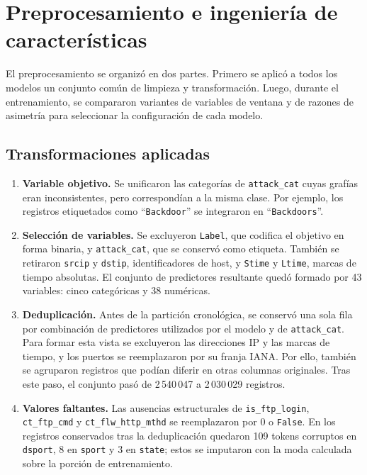 \documentclass[conference]{IEEEtran}
\begin{document}
\section{Preprocesamiento e ingeniería de características}

El preprocesamiento se organizó en dos partes. Primero se aplicó a todos los modelos un conjunto común de limpieza y transformación. Luego, durante el entrenamiento, se compararon variantes de variables de ventana y de razones de asimetría para seleccionar la configuración de cada modelo.

\subsection{Transformaciones aplicadas}

\begin{enumerate}

\item \textbf{Variable objetivo.} Se unificaron las categorías de \texttt{attack\_cat} cuyas grafías eran inconsistentes, pero correspondían a la misma clase. Por ejemplo, los registros etiquetados como ``\texttt{Backdoor}'' se integraron en ``\texttt{Backdoors}''.

\item \textbf{Selección de variables.} Se excluyeron \texttt{Label}, que codifica el objetivo en forma binaria, y \texttt{attack\_cat}, que se conservó como etiqueta. También se retiraron \texttt{srcip} y \texttt{dstip}, identificadores de host, y \texttt{Stime} y \texttt{Ltime}, marcas de tiempo absolutas. El conjunto de predictores resultante quedó formado por 43 variables: cinco categóricas y 38 numéricas.

\item \textbf{Deduplicación.} Antes de la partición cronológica, se conservó una sola fila por combinación de predictores utilizados por el modelo y de \texttt{attack\_cat}. Para formar esta vista se excluyeron las direcciones IP y las marcas de tiempo, y los puertos se reemplazaron por su franja IANA. Por ello, también se agruparon registros que podían diferir en otras columnas originales. Tras este paso, el conjunto pasó de 2\,540\,047 a 2\,030\,029 registros.

\item \textbf{Valores faltantes.} Las ausencias estructurales de \texttt{is\_ftp\_login}, \texttt{ct\_ftp\_cmd} y \texttt{ct\_flw\_http\_mthd} se reemplazaron por 0 o \texttt{False}. En los registros conservados tras la deduplicación quedaron 109 tokens corruptos en \texttt{dsport}, 8 en \texttt{sport} y 3 en \texttt{state}; estos se imputaron con la moda calculada sobre la porción de entrenamiento.


\end{enumerate}
\end{document}
